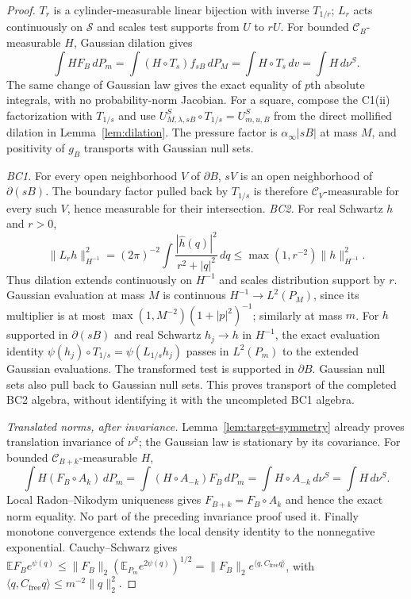 \documentclass[11pt]{article}
\theoremstyle{plain}
\theoremstyle{definition}
\theoremstyle{remark}
\newcommand{\E}{\mathbb{E}}
\newcommand{\cC}{\mathcal{C}}
\newcommand{\cS}{\mathcal{S}}
\newcommand{\Cfree}{C_{\mathrm{free}}}
\begin{document}
\begin{proof}
$T_r$ is a cylinder-measurable linear bijection with inverse $T_{1/r}$;
$L_r$ acts continuously on $\cS$ and scales test supports from $U$ to $rU$.
For bounded $\cC_B$-measurable $H$, Gaussian dilation gives
\[
 \int HF_B\,dP_m
 =\int(H\circ T_s)f_{sB}\,dP_M
 =\int H\circ T_s\,dv=\int H\,d\nu^S.
\]
The same change of Gaussian law gives the exact equality of $p$th absolute
integrals, with no probability-norm Jacobian. For a square, compose the
C1(ii) factorization with $T_{1/s}$ and use
$U^S_{M,\lambda,sB}\circ T_{1/s}=U^S_{m,u,B}$ from the direct mollified
dilation in Lemma~\ref{lem:dilation}. The pressure factor is
$\alpha_\infty|sB|$ at mass $M$, and positivity of $g_B$ transports with
Gaussian null sets.

\emph{BC1.} For every open neighborhood $V$ of $\partial B$, $sV$ is an
open neighborhood of $\partial(sB)$. The boundary factor pulled back by
$T_{1/s}$ is therefore $\cC_V$-measurable for every such $V$, hence
measurable for their intersection.
\emph{BC2.} For real Schwartz $h$ and $r>0$,
\begin{equation}\label{eq:boundary-dilation}
 \|L_rh\|_{H^{-1}}^2
 =(2\pi)^{-2}\int\frac{|\hat h(q)|^2}{r^2+|q|^2}\,dq
 \le\max(1,r^{-2})\|h\|_{H^{-1}}^2.
\end{equation}
Thus dilation extends continuously on $H^{-1}$ and scales distribution
support by $r$. Gaussian evaluation at mass $M$ is continuous
$H^{-1}\to L^2(P_M)$, since its multiplier is at most
$\max(1,M^{-2})(1+|p|^2)^{-1}$; similarly at mass $m$.
For $h$ supported in $\partial(sB)$ and real Schwartz $h_j\to h$ in
$H^{-1}$, the exact evaluation identity
$\psi(h_j)\circ T_{1/s}=\psi(L_{1/s}h_j)$ passes in $L^2(P_m)$ to the
extended Gaussian evaluations. The transformed test is supported in
$\partial B$. Gaussian null sets also pull back to Gaussian null sets.
This proves transport of the completed BC2 algebra, without identifying it
with the uncompleted BC1 algebra.

\emph{Translated norms, after invariance.}
Lemma~\ref{lem:target-symmetry} already proves translation invariance of
$\nu^S$; the Gaussian law is stationary by its covariance. For bounded
$\cC_{B+k}$-measurable $H$,
\[
 \int H(F_B\circ A_k)\,dP_m
 =\int(H\circ A_{-k})F_B\,dP_m
 =\int H\circ A_{-k}\,d\nu^S=\int H\,d\nu^S.
\]
Local Radon--Nikodym uniqueness gives $F_{B+k}=F_B\circ A_k$ and hence
the exact norm equality. No part of the preceding invariance proof used it.
Finally monotone convergence extends the local density identity to the
nonnegative exponential. Cauchy--Schwarz gives
$\E F_Be^{\psi(q)}\le\|F_B\|_2(\E_{P_m}e^{2\psi(q)})^{1/2}
=\|F_B\|_2e^{\langle q,\Cfree q\rangle}$, with
$\langle q,\Cfree q\rangle\le m^{-2}\|q\|_2^2$.
\end{proof}
\end{document}
